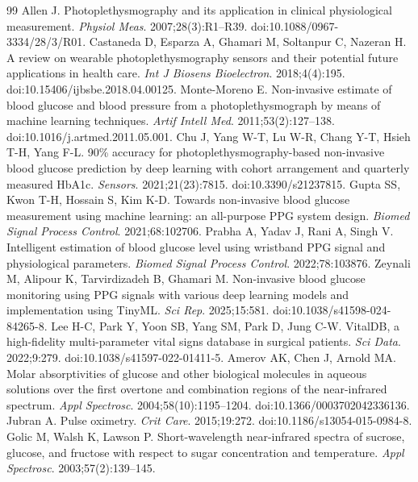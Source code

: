 \documentclass[11pt]{article}
\begin{document}
\begin{thebibliography}{99}\small
\setlength{\itemsep}{1pt}
 Allen J. Photoplethysmography and its application in clinical physiological measurement. \emph{Physiol Meas}. 2007;28(3):R1--R39. doi:10.1088/0967-3334/28/3/R01.
 Castaneda D, Esparza A, Ghamari M, Soltanpur C, Nazeran H. A review on wearable photoplethysmography sensors and their potential future applications in health care. \emph{Int J Biosens Bioelectron}. 2018;4(4):195. doi:10.15406/ijbsbe.2018.04.00125.
 Monte-Moreno E. Non-invasive estimate of blood glucose and blood pressure from a photoplethysmograph by means of machine learning techniques. \emph{Artif Intell Med}. 2011;53(2):127--138. doi:10.1016/j.artmed.2011.05.001.
 Chu J, Yang W-T, Lu W-R, Chang Y-T, Hsieh T-H, Yang F-L. 90\% accuracy for photoplethysmography-based non-invasive blood glucose prediction by deep learning with cohort arrangement and quarterly measured HbA1c. \emph{Sensors}. 2021;21(23):7815. doi:10.3390/s21237815.
 Gupta SS, Kwon T-H, Hossain S, Kim K-D. Towards non-invasive blood glucose measurement using machine learning: an all-purpose PPG system design. \emph{Biomed Signal Process Control}. 2021;68:102706.
 Prabha A, Yadav J, Rani A, Singh V. Intelligent estimation of blood glucose level using wristband PPG signal and physiological parameters. \emph{Biomed Signal Process Control}. 2022;78:103876.
 Zeynali M, Alipour K, Tarvirdizadeh B, Ghamari M. Non-invasive blood glucose monitoring using PPG signals with various deep learning models and implementation using TinyML. \emph{Sci Rep}. 2025;15:581. doi:10.1038/s41598-024-84265-8.
 Lee H-C, Park Y, Yoon SB, Yang SM, Park D, Jung C-W. VitalDB, a high-fidelity multi-parameter vital signs database in surgical patients. \emph{Sci Data}. 2022;9:279. doi:10.1038/s41597-022-01411-5.
 Amerov AK, Chen J, Arnold MA. Molar absorptivities of glucose and other biological molecules in aqueous solutions over the first overtone and combination regions of the near-infrared spectrum. \emph{Appl Spectrosc}. 2004;58(10):1195--1204. doi:10.1366/0003702042336136.
 Jubran A. Pulse oximetry. \emph{Crit Care}. 2015;19:272. doi:10.1186/s13054-015-0984-8.
 Golic M, Walsh K, Lawson P. Short-wavelength near-infrared spectra of sucrose, glucose, and fructose with respect to sugar concentration and temperature. \emph{Appl Spectrosc}. 2003;57(2):139--145.

\end{thebibliography}
\end{document}
